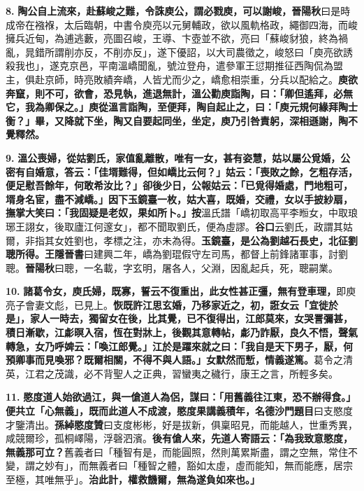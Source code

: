 \textbf{8.} \textbf{陶公自上流來，赴蘇峻之難，令誅庾公，謂必戮庾，可以謝峻，}{\footnotesize \textbf{晉陽秋}曰是時成帝在襁褓，太后臨朝，中書令庾亮以元舅輔政，欲以風軌格政，繩御四海，而峻擁兵近甸，為逋逃藪，亮圖召峻，王導、卞壺並不欲，亮曰「蘇峻豺狼，終為禍亂，晁錯所謂削亦反，不削亦反」，遂下優詔，以大司農徵之，峻怒曰「庾亮欲誘殺我也」，遂克京邑，平南溫嶠聞亂，號泣登舟，遣參軍王愆期推征西陶侃為盟主，俱赴京師，時亮敗績奔嶠，人皆尤而少之，嶠愈相崇重，分兵以配給之。}\textbf{庾欲奔竄，則不可，欲會，恐見執，進退無計，溫公勸庾詣陶，曰：「卿但遙拜，必無它，我為卿保之。」庾從溫言詣陶，至便拜，陶自起止之，曰：「庾元規何緣拜陶士衡？」畢，又降就下坐，陶又自要起同坐，坐定，庾乃引咎責躬，深相遜謝，陶不覺釋然。}

\textbf{9.} \textbf{溫公喪婦，從姑劉氏，家值亂離散，唯有一女，甚有姿慧，姑以屬公覓婚，公密有自婚意，答云：「佳壻難得，但如嶠比云何？」姑云：「喪敗之餘，乞粗存活，便足慰吾餘年，何敢希汝比？」卻後少日，公報姑云：「已覓得婚處，門地粗可，壻身名宦，盡不減嶠。」因下玉鏡臺一枚，姑大喜，既婚，交禮，女以手披紗扇，撫掌大笑曰：「我固疑是老奴，果如所卜。」}{\footnotesize \textbf{按}溫氏譜「嶠初取高平李暅女，中取琅琊王詡女，後取廬江何邃女」，都不聞取劉氏，便為虛謬。\textbf{谷口}云劉氏，政謂其姑爾，非指其女姓劉也，孝標之注，亦未為得。}\textbf{玉鏡臺，是公為劉越石長史，北征劉聰所得。}{\footnotesize \textbf{王隱晉書}曰建興二年，嶠為劉琨假守左司馬，都督上前鋒諸軍事，討劉聰。\textbf{晉陽秋}曰聰，一名載，字玄明，屠各人，父淵，因亂起兵，死，聰嗣業。}

\textbf{10.} \textbf{諸葛令女，庾氏婦，既寡，誓云不復重出，此女性甚正彊，無有登車理，}{\footnotesize 即庾亮子會妻文彪，已見上。}\textbf{恢既許江思玄婚，乃移家近之，初，誑女云「宜徙於是」，家人一時去，獨留女在後，比其覺，已不復得出，江郎莫來，女哭詈彌甚，積日漸歇，江虨暝入宿，恆在對牀上，後觀其意轉帖，虨乃詐厭，良久不悟，聲氣轉急，女乃呼婢云：「喚江郎覺。」江於是躍來就之曰：「我自是天下男子，厭，何預卿事而見喚邪？既爾相關，不得不與人語。」女默然而慙，情義遂篤。}{\footnotesize 葛令之清英，江君之茂識，必不背聖人之正典，習蠻夷之穢行，康王之言，所輕多矣。}

\textbf{11.} \textbf{愍度道人始欲過江，與一傖道人為侶，謀曰：「用舊義往江東，恐不辦得食。」便共立「心無義」，既而此道人不成渡，愍度果講義積年，}{\footnotesize \textbf{名德沙門題目}曰支愍度才鑒清出。\textbf{孫綽愍度贊}曰支度彬彬，好是拔新，俱稟昭見，而能越人，世重秀異，咸競爾珍，孤桐嶧陽，浮磬泗濱。}\textbf{後有傖人來，先道人寄語云：「為我致意愍度，無義那可立？}{\footnotesize 舊義者曰「種智有是，而能圓照，然則萬累斯盡，謂之空無，常住不變，謂之妙有」，而無義者曰「種智之體，豁如太虛，虛而能知，無而能應，居宗至極，其唯無乎」。}\textbf{治此計，權救饑爾，無為遂負如來也。」}

